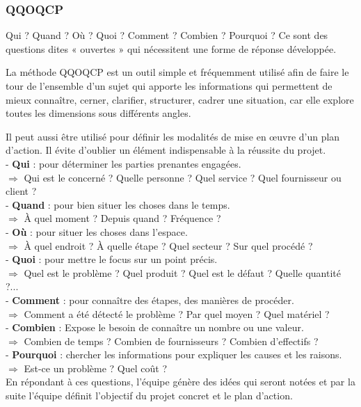 \documentclass[12pt, a4paper]{thesis}
\begin{document}
\subsubsection{QQOQCP}
 Qui ? Quand ? Où ? Quoi ? Comment ? Combien ? Pourquoi ? Ce sont des questions dites « ouvertes » qui nécessitent une forme de réponse développée.
 
La méthode QQOQCP est un outil simple et fréquemment utilisé afin de faire le tour de l’ensemble d’un sujet qui apporte les informations qui permettent de mieux connaître, cerner, clarifier, structurer, cadrer une situation, car elle explore toutes les dimensions sous différents angles. 

Il peut aussi être utilisé pour définir les modalités de mise en œuvre d’un plan d’action. Il évite d’oublier un élément indispensable à la réussite du projet. \\
- \textbf{Qui} : pour déterminer les parties prenantes engagées.\\
$ \Longrightarrow$  Qui est le concerné ? Quelle personne ? Quel service ? Quel fournisseur ou client ? \\
- \textbf{Quand} : pour bien situer les choses dans le temps. \\
$ \Longrightarrow$ À quel moment ? Depuis quand ? Fréquence ? \\
-\textbf{ Où} : pour situer les choses dans l’espace. \\
$ \Longrightarrow$ À quel endroit ? À quelle étape ? Quel secteur ? Sur quel procédé ? \\
-\textbf{ Quoi} : pour mettre le focus sur un point précis. \\
$ \Longrightarrow$ Quel est le problème ? Quel produit ? Quel est le défaut ? Quelle quantité ?...\\
- \textbf{Comment} : pour connaître des étapes, des manières de procéder. \\
$ \Longrightarrow$ Comment a été détecté le problème ? Par quel moyen ? Quel matériel ? \\
- \textbf{Combien} : Expose le besoin de connaître un nombre ou une valeur.\\
$ \Longrightarrow$ Combien de temps ? Combien de fournisseurs ? Combien d’effectifs ?\\
- \textbf{Pourquoi} : chercher les informations pour expliquer les causes et les raisons. \\
$ \Longrightarrow$ Est-ce un problème ? Quel coût ? \\
En répondant à ces questions, l’équipe génère des idées qui seront notées et par la suite l’équipe définit l’objectif du projet concret et le plan d’action. 
\end{document}
